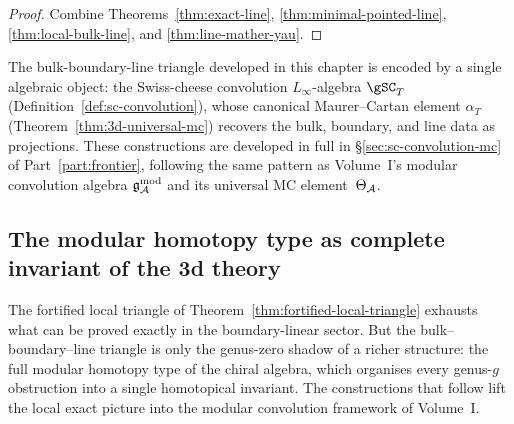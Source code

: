 \begin{proof}
Combine Theorems~\ref{thm:exact-line}, \ref{thm:minimal-pointed-line}, \ref{thm:local-bulk-line}, and \ref{thm:line-mather-yau}.
\end{proof}

\begin{remark}
\label{rem:forward-ref-sc-convolution}
The bulk-boundary-line triangle developed in this chapter is
encoded by a single algebraic object: the Swiss-cheese convolution
$L_\infty$-algebra $\gSC_T$
(Definition~\ref{def:sc-convolution}), whose canonical
Maurer--Cartan element $\alpha_T$
(Theorem~\ref{thm:3d-universal-mc}) recovers the bulk, boundary,
and line data as projections. These constructions are developed
in full in \S\ref{sec:sc-convolution-mc} of
Part~\ref{part:frontier}, following the same pattern as
Volume~I's modular convolution algebra $\mathfrak{g}^{\mathrm{mod}}_{\mathcal{A}}$ and its universal
MC element~$\Theta_{\mathcal{A}}$.
\end{remark}


\subsection{The modular homotopy type as complete invariant of the 3d theory}
\label{subsec:modular-homotopy-type}

The fortified local triangle of
Theorem~\ref{thm:fortified-local-triangle} exhausts what can be
proved exactly in the boundary-linear sector. But the bulk--boundary--line
triangle is only the genus-zero shadow of a richer structure: the
full modular homotopy type of the chiral algebra, which organises
every genus-$g$ obstruction into a single homotopical invariant.
The constructions that follow lift the local exact picture into
the modular convolution framework of Volume~I.

